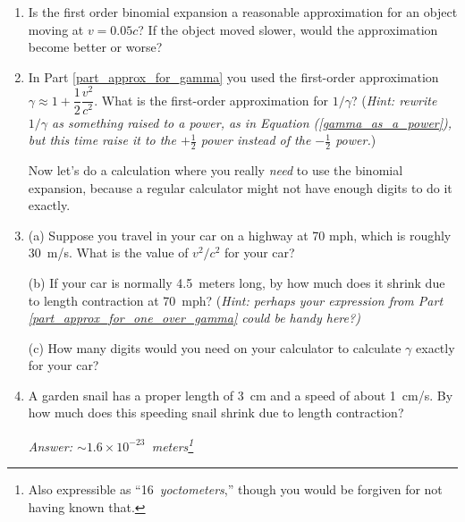 \begin{enumerate}
\item Is the first order binomial expansion a reasonable approximation for an object moving at $v=0.05c$?  If the object moved slower, would the approximation become better or worse?
\answerspace{0.5in}

\item In Part \ref{part_approx_for_gamma} you used the first-order approximation $\gamma \approx 1 + \dfrac{1}{2}\dfrac{v^2}{c^2}$. What is the first-order approximation for $1 / \gamma$? (\textit{Hint: rewrite $1 / \gamma$ as something raised to a power, as in Equation (\ref{gamma_as_a_power}), but this time raise it to the $+\frac{1}{2}$ power instead of the $-\frac{1}{2}$ power.})
\label{part_approx_for_one_over_gamma}
\answerspace{0.5in}

Now let's do a calculation where you really \textit{need} to use the binomial expansion, because a regular calculator might not have enough digits to do it exactly.  
\item (a) Suppose you travel in your car on a highway at 70 mph, which is roughly 30~m/s.  What is the value of ${v^2}/{c^2}$ for your car?  
\answerspace{0.5in}

(b) If your car is normally 4.5~meters long, by how much does it shrink due to length contraction at 70~mph?  (\textit{Hint: perhaps your expression from Part \ref{part_approx_for_one_over_gamma} could be handy here?)}
\answerspace{0.5in}

(c) How many digits would you need on your calculator to calculate $\gamma$ exactly for your car? 
\answerspace{0.5in}

\item A garden snail has a proper length of 3~cm and a speed of about 1~cm/s.  By how much does this speeding snail shrink due to length contraction?
\answerspace{0.5in}

\vspace{\fill}
\hspace{\fill} \textit{Answer: $\sim 1.6 \times 10^{-23}$~meters\footnote{Also expressible as ``16~\textit{yoctometers},'' though you would be forgiven for not having known that.}} 
\bigskip

\end{enumerate}